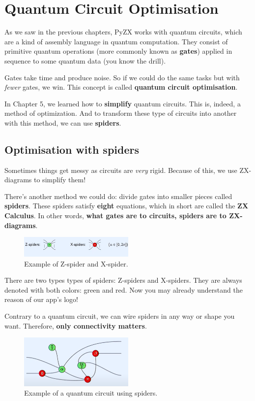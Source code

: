 \chapter{Quantum Circuit Optimisation}
As we saw in the previous chapters, PyZX works with quantum circuits, which are a kind of assembly language in quantum computation. They consist of primitive quantum operations (more commonly known as \textbf{gates}) applied in sequence to some quantum data (you know the drill). 

Gates take time and produce noise. So if we could do the same tasks but with \textit{fewer} gates, we win. This concept is called \textbf{quantum circuit optimisation}.

In Chapter 5, we learned how to \textbf{simplify} quantum circuits. This is, indeed, a method of optimization. And to transform these type of circuits into another with this method, we can use \textbf{spiders}.

\section{Optimisation with spiders}
Sometimes things get messy as circuits are \textit{very} rigid. Because of this, we use ZX-diagrams to simplify them! 

There's another method we could do: divide gates into smaller pieces called \textbf{spiders}. These spiders satisfy \textbf{eight} equations, which in short are called the \textbf{ZX Calculus}. In other words, \textbf{what gates are to circuits, spiders are to ZX-diagrams}. 

\begin{figure}[H]
        \centering
        \includegraphics[width=0.5\textwidth]{Figures/spiderspic.png}
        \caption{Example of Z-spider and X-spider.}
        \label{fig:spiders.picture}
    \end{figure}
There are two types types of spiders: Z-spiders and X-spiders. They are always denoted with both colors: green and red. Now you may already understand the reason of our app's logo! 

Contrary to a quantum circuit, we can wire spiders in any way or shape you want. Therefore, \textbf{only connectivity matters}.
\begin{figure}[H]
        \centering
        \includegraphics[width=0.5\textwidth]{Figures/example.spiders.png}
        \caption{Example of a quantum circuit using spiders.}
        \label{fig:spiders.picture}
    \end{figure}

